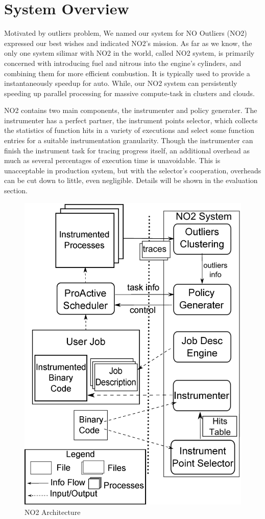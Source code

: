 \section{System Overview}

Motivated by outliers problem, We named our system for NO Outliers (NO2) expressed our best wishes and indicated NO2’s mission. As far as we know, the only one system silimar with NO2 in the world, called NO2 system, is primarily concerned with introducing fuel and nitrous into the engine's cylinders, and combining them for more efficient combustion. It is typically used to provide a instantaneously speedup for auto. While, our NO2 system can persistently speeding up parallel processing for massive compute-task in clusters and clouds.

NO2 contains two main components, the instrumenter and policy generater. The instrumenter has a perfect partner, the instrument points selector, which collects the statistics of function hits in a variety of executions and select some function entries for a suitable instrumentation granularity. Though the instrumenter can finish the instrument task for tracing progress itself, an additional overhead as much as several percentages of execution time is unavoidable. This is unacceptable in production system, but with the selector's cooperation, overheads can be cut down to little, even negligible. Details will be shown in the evaluation section. 

\begin{figure}
\centering
\includegraphics[width=0.9\columnwidth]{figures/NO2_arch.eps}
\caption{NO2 Architecture}
\label{figure:no2arch}
\end{figure}


